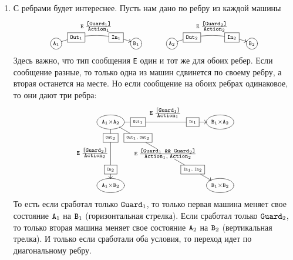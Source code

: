 \documentclass{article}
\begin{document}
{\begin{enumerate}
\item С ребрами будет интереснее.
Пусть нам дано по ребру из каждой машины
\[
\xymatrix{
  *+=+[o][F-]{\scriptstyle\texttt{A}_1}\ar@/^10pt/[rrr]^{\raisebox{6pt}{$\scriptstyle\texttt{E}\; \frac{\scriptstyle \texttt{[Guard}_1\texttt{]}}{\scriptstyle \texttt{Action}_1}$}}|(0.25){\boxed{\scriptstyle\texttt{Out}_1}}|(0.75){\boxed{\scriptstyle\texttt{In}_1}}&{}&{}&
  *+=+[o][F-]{\scriptstyle\texttt{B}_1}\\
}
\quad\quad\quad
\xymatrix{
  *+=+[o][F-]{\scriptstyle\texttt{A}_2}\ar@/^10pt/[rrr]^{\raisebox{6pt}{$\scriptstyle\texttt{E}\; \frac{\scriptstyle \texttt{[Guard}_2\texttt{]}}{\scriptstyle \texttt{Action}_2}$}}|(0.25){\boxed{\scriptstyle\texttt{Out}_2}}|(0.75){\boxed{\scriptstyle\texttt{In}_2}}&{}&{}&
  *+=+[o][F-]{\scriptstyle\texttt{B}_2}\\
}
\]
Здесь важно, что тип сообщения \verb"E" один и тот же для обоих ребер.
Если сообщение разные, то только одна из машин сдвинется по своему ребру, а вторая останется на месте.
Но если сообщение на обоих ребрах одинаковое, то они дают три ребра:
\[
\xymatrix@R=60pt@C=100pt{
  *++[o][F-]{\scriptstyle\texttt{A}_1\times \texttt{A}_2}
  \ar[r]^{\raisebox{6pt}{$\scriptstyle\texttt{E}\; \frac{\scriptstyle \texttt{[Guard}_1\texttt{]}}{\scriptstyle \texttt{Action}_1}$}}|(0.25){\boxed{\scriptscriptstyle \texttt{Out}_1}}|(0.75){\boxed{\scriptscriptstyle \texttt{In}_1}}
  \ar[d]_{\raisebox{6pt}{$\scriptstyle\texttt{E}\; \frac{\scriptstyle \texttt{[Guard}_2\texttt{]}}{\scriptstyle \texttt{Action}_2}$}}|(0.25){\boxed{\scriptscriptstyle \texttt{Out}_2}}|(0.75){\boxed{\scriptscriptstyle \texttt{In}_2}}
  \ar[rd]|(0.25){\boxed{\scriptscriptstyle \texttt{Out}_1,\;\texttt{Out}_2}}|(0.5){\raisebox{0pt}{$\scriptstyle\texttt{E}\; \frac{\scriptstyle \texttt{[Guard}_1\texttt{ \&\& Guard}_2\texttt{]}}{\scriptstyle \texttt{Action}_1,\;\texttt{Action}_2}$}}|(0.75){\boxed{\scriptscriptstyle \texttt{In}_1,\;\texttt{In}_2}}
  &
  *++[o][F-]{\scriptstyle\texttt{B}_1\times \texttt{A}_2}
  \\
  *++[o][F-]{\scriptstyle\texttt{A}_1\times \texttt{B}_2}
  &
  *++[o][F-]{\scriptstyle\texttt{B}_1\times \texttt{B}_2}
  \\
}
\]
То есть если сработал только $\verb"Guard"_1$, то только первая машина меняет свое состояние $\verb"A"_1$ на $\verb"B"_1$ (горизонтальная стрелка).
Если сработал только $\verb"Guard"_2$, то только вторая машина меняет свое состояние $\verb"A"_2$ на $\verb"B"_2$ (вертикальная трелка).
И только если сработали оба условия, то переход идет по диагональному ребру.


\end{enumerate}}
\end{document}
